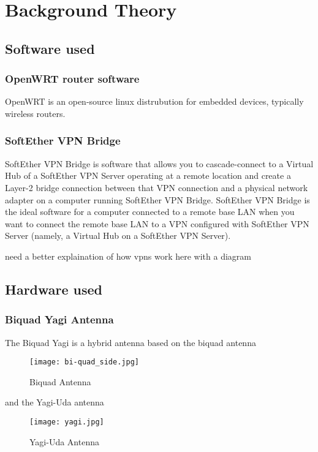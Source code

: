 \section{Background Theory}

\subsection{Software used}
\subsubsection{OpenWRT router software}
OpenWRT is an open-source linux distrubution for embedded devices, typically wireless routers.

\subsubsection{SoftEther VPN Bridge}
\label{sec:comms_theory_vpn} %
SoftEther VPN Bridge is software that allows you to cascade-connect to a Virtual Hub of a SoftEther VPN Server operating at a remote location and create a Layer-2 bridge connection between that VPN connection and a physical network adapter on a computer running SoftEther VPN Bridge. SoftEther VPN Bridge is the ideal software for a computer connected to a remote base LAN when you want to connect the remote base LAN to a VPN configured with SoftEther VPN Server (namely, a Virtual Hub on a SoftEther VPN Server).

need a better explaination of how vpns work here with a diagram 

\subsection{Hardware used}
\subsubsection{Biquad Yagi Antenna}
The Biquad Yagi is a hybrid antenna based on the biquad antenna

\begin{figure}[!htb]
\begin{center}
\texttt{[image: bi-quad\_side.jpg]}
\end{center}
\caption{Biquad Antenna}
\label{fig:biquad}
\end{figure}


and the Yagi-Uda antenna


\begin{figure}[!htb]
\begin{center}
\texttt{[image: yagi.jpg]}
\end{center}
\caption{Yagi-Uda Antenna}
\label{fig:yagi}
\end{figure}


